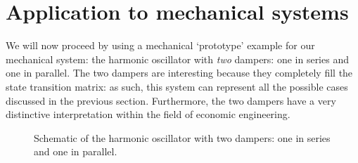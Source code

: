 \section{Application to mechanical systems}
We will now proceed by using a mechanical `prototype' example for our mechanical system: the harmonic oscillator with \emph{two} dampers: one in series and one in parallel. The two dampers are interesting because they completely fill the state transition matrix: as such, this system can represent all the possible cases discussed in the previous section. Furthermore, the two dampers have a very distinctive interpretation within the field of economic engineering.
\begin{figure}[ht!]
    \centering
    
    \caption{Schematic of the harmonic oscillator with two dampers: one in series and one in parallel.}
    \label{fig:double_damped_osc}
\end{figure}

